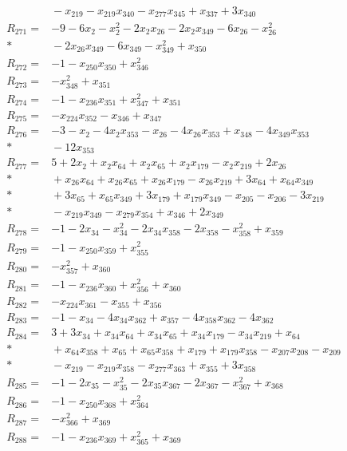 \begin{align*}
&{}-x_{219}-x_{219}x_{340}-x_{277}x_{345}+x_{337}+3x_{340}\\[3pt]
R_{271}={}&-9-6x_{2}-x_{2}^{2}-2x_{2}x_{26}-2x_{2}x_{349}-6x_{26}-x_{26}^{2}\\*
&{}-2x_{26}x_{349}-6x_{349}-x_{349}^{2}+x_{350}\\[3pt]
R_{272}={}&-1-x_{250}x_{350}+x_{346}^{2}\\[3pt]
R_{273}={}&-x_{348}^{2}+x_{351}\\[3pt]
R_{274}={}&-1-x_{236}x_{351}+x_{347}^{2}+x_{351}\\[3pt]
R_{275}={}&-x_{224}x_{352}-x_{346}+x_{347}\\[3pt]
R_{276}={}&-3-x_{2}-4x_{2}x_{353}-x_{26}-4x_{26}x_{353}+x_{348}-4x_{349}x_{353}\\*
&{}-12x_{353}\\[3pt]
R_{277}={}&5+2x_{2}+x_{2}x_{64}+x_{2}x_{65}+x_{2}x_{179}-x_{2}x_{219}+2x_{26}\\*
&{}+x_{26}x_{64}+x_{26}x_{65}+x_{26}x_{179}-x_{26}x_{219}+3x_{64}+x_{64}x_{349}\\*
&{}+3x_{65}+x_{65}x_{349}+3x_{179}+x_{179}x_{349}-x_{205}-x_{206}-3x_{219}\\*
&{}-x_{219}x_{349}-x_{279}x_{354}+x_{346}+2x_{349}\\[3pt]
R_{278}={}&-1-2x_{34}-x_{34}^{2}-2x_{34}x_{358}-2x_{358}-x_{358}^{2}+x_{359}\\[3pt]
R_{279}={}&-1-x_{250}x_{359}+x_{355}^{2}\\[3pt]
R_{280}={}&-x_{357}^{2}+x_{360}\\[3pt]
R_{281}={}&-1-x_{236}x_{360}+x_{356}^{2}+x_{360}\\[3pt]
R_{282}={}&-x_{224}x_{361}-x_{355}+x_{356}\\[3pt]
R_{283}={}&-1-x_{34}-4x_{34}x_{362}+x_{357}-4x_{358}x_{362}-4x_{362}\\[3pt]
R_{284}={}&3+3x_{34}+x_{34}x_{64}+x_{34}x_{65}+x_{34}x_{179}-x_{34}x_{219}+x_{64}\\*
&{}+x_{64}x_{358}+x_{65}+x_{65}x_{358}+x_{179}+x_{179}x_{358}-x_{207}x_{208}-x_{209}\\*
&{}-x_{219}-x_{219}x_{358}-x_{277}x_{363}+x_{355}+3x_{358}\\[3pt]
R_{285}={}&-1-2x_{35}-x_{35}^{2}-2x_{35}x_{367}-2x_{367}-x_{367}^{2}+x_{368}\\[3pt]
R_{286}={}&-1-x_{250}x_{368}+x_{364}^{2}\\[3pt]
R_{287}={}&-x_{366}^{2}+x_{369}\\[3pt]
R_{288}={}&-1-x_{236}x_{369}+x_{365}^{2}+x_{369}\\[3pt]

\end{align*}
